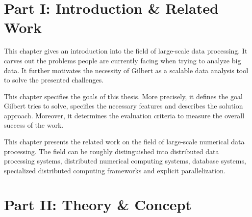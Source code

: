 \clearemptydoublepage

{}

\begin{center}
\end{center}

\section*{Part I: Introduction \& Related Work}

\vspace{3mm}


\noindent This chapter gives an introduction into the field of large-scale data processing. 
It carves out the problems people are currently facing when trying to analyze big data. 
It further motivates the necessity of Gilbert as a scalable data analysis tool to solve the presented challenges.

\vspace{3mm}


\noindent This chapter specifies the goals of this thesis. 
More precisely, it defines the goal Gilbert tries to solve, specifies the necessary features and describes the solution approach. 
Moreover, it determines the evaluation criteria to measure the overall success of the work.

\vspace{3mm}


\noindent This chapter presents the related work on the field of large-scale numerical data processing. 
The field can be roughly distinguished into distributed data processing systems, distributed numerical computing systems, database systems, specialized distributed computing frameworks and explicit parallelization.

\vspace{3mm}

\section*{Part II: Theory \& Concept}

\vspace{3mm}

